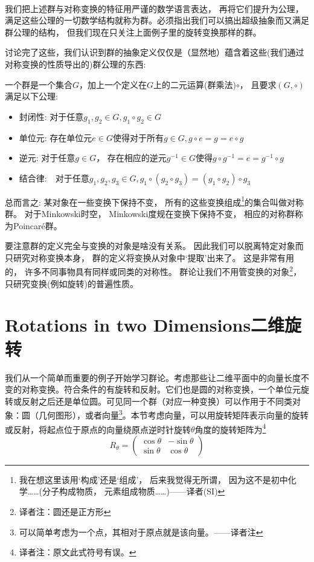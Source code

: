 \

我们把上述群与对称变换的特征用严谨的数学语言表达， 再将它们提升为公理， 满足这些公理的一切数学结构就称为群。必须指出我们可以搞出超级抽象而又满足群公理的结构， 但我们现在只关注上面例子里的旋转变换那样的群。

讨论完了这些，我们认识到群的抽象定义仅仅是（显然地）蕴含着这些(我们通过对称变换的性质导出的)群公理的东西:

一个群是一个集合$G$，加上一个定义在$G$上的二元运算(群乘法)$\circ$， 且要求$(G, \circ)$满足以下公理:
\begin{itemize}
	\item 封闭性: 对于任意$g_1, g_2 \in G, g_1 \circ g_2 \in G$

	\item 单位元: 存在单位元$e \in G$使得对于所有$g \in G, g\circ e = g = e \circ g$

	\item 逆元: 对于任意$g \in G$， 存在相应的逆元$g^{-1} \in G$使得$g \circ g^{-1} = e = g^{-1} \circ g$

	\item 结合律:　对于任意$g_1, g_2, g_3 \in G, g_1 \circ (g_2 \circ g_3) = (g_1 \circ g_2) \circ g_3$
\end{itemize}

总而言之: 某对象在一些变换下保持不变， 所有的这些变换组成\footnote{我在想这里该用‘构成’还是‘组成’， 后来我觉得无所谓， 因为这不是初中化学……(分子构成物质， 元素组成物质……)——译者(SI)}的集合叫做对称群。 对于Minkowski时空， Minkowski度规在变换下保持不变， 相应的对称群称为Poincar\'e群。

要注意群的定义完全与变换的对象是啥没有关系。 因此我们可以脱离特定对象而只研究对称变换本身， 群的定义将变换从对象中‘提取’出来了。 这是非常有用的， 许多不同事物具有同样或同类的对称性。 群论让我们不用管变换的对象\footnote{译者注：圆还是正方形}， 只研究变换(例如旋转)的普遍性质。


\section[二维旋转]{Rotations in two Dimensions\quad 二维旋转}
\label{sec3.2}
我们从一个简单而重要的例子开始学习群论。考虑那些让二维平面中的向量长度不变的对称变换。符合条件的有旋转和反射。它们也是圆的对称变换，一个单位元旋转或反射之后还是单位圆。可见同一个群（对应一种变换）可以作用于不同类对象：圆（几何图形），或者向量\footnote{可以简单考虑为一个点，其相对于原点就是该向量。——译者注}。本节考虑向量，可以用旋转矩阵表示向量的旋转或反射，将起点位于原点的向量绕原点逆时针旋转$\theta$角度的旋转矩阵为\footnote{译者注：原文此式符号有误。}
\begin{equation}
\label{equ3.3}
R_\theta =
	\begin{pmatrix}
		\cos \theta & -\sin \theta \\
		\sin \theta & \cos \theta
	\end{pmatrix}
\end{equation}

